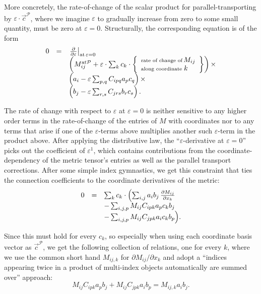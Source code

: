 \documentclass[twocolumn]{article}
\begin{document}
More concretely, the rate-of-change of the scalar product for
parallel-transporting by $\varepsilon\cdot\vec c^{\mathcal P}$, where
we imagine $\varepsilon$ to gradually increase from zero to some small
quantity, must be zero at $\varepsilon=0$. Structurally, the
corresponding equation is of the form
%
\begin{equation}
  \begin{array}{lcl}
    0&=&\left.\frac{\partial}{\partial\varepsilon}\right|_{\text{at}\,\varepsilon=0}\\
    &&\left(M_{ij}^{\text{at} {\mathcal P}}+\varepsilon\cdot\sum_k c_k\cdot
    \left\{
    \begin{array}{l}
      \text{\scriptsize rate of change of}\,M_{ij}\\
      \text{\scriptsize along coordinate}\;k
    \end{array}
    \right\}
    \right)\times\\
     &&\left(a_i-\varepsilon\sum_{p, q}C_{ipq}a_pc_q\right)\times\\
     &&\left(b_j-\varepsilon\sum_{r, s}C_{jrs}b_rc_s\right).
  \end{array}
\end{equation}

The rate of change with respect to $\varepsilon$ at $\varepsilon=0$ is
neither sensitive to any higher order terms in the rate-of-change of
the entries of $M$ with coordinates nor to any terms that arise if one
of the $\varepsilon$-terms above multiplies another such
$\varepsilon$-term in the product above. After applying the
distributive law, the ``$\varepsilon$-derivative at $\varepsilon=0$''
picks out the coefficient of $\varepsilon^1$, which contains
contributions from the coordinate-dependency of the metric tensor's
entries as well as the parallel transport corrections. After some
simple index gymnastics, we get this constraint that ties the
connection coefficients to the coordinate derivatives of the metric:
%
\begin{equation}
  \begin{array}{lcl}
    0&=&\sum_kc_k\cdot\Bigl(\sum_{i,j}a_ib_j\,\frac{\partial M_{ij}}{\partial x_k}\\
    &&-\sum_{i,j,p} M_{ij}C_{ipk}a_pc_kb_j\\
    &&-\sum_{i,j,p} M_{ij}C_{jpk}a_ic_kb_p\Bigr).
  \end{array}
\end{equation}

Since this must hold for every $c_k$, so especially when using each
coordinate basis vector as $\vec c^{\mathcal P}$, we get the following
collection of relations, one for every $k$, where we use the common
short hand $M_{ij,k}$ for $\partial M_{ij}/\partial x_k$ and adopt a
``indices appearing twice in a product of multi-index objects automatically
are summed over'' approach:
%
\begin{equation}
M_{ij}C_{ipk}a_pb_j + M_{ij}C_{jpk}a_ib_p = M_{ij,k}a_i b_j.
\end{equation}
\end{document}
